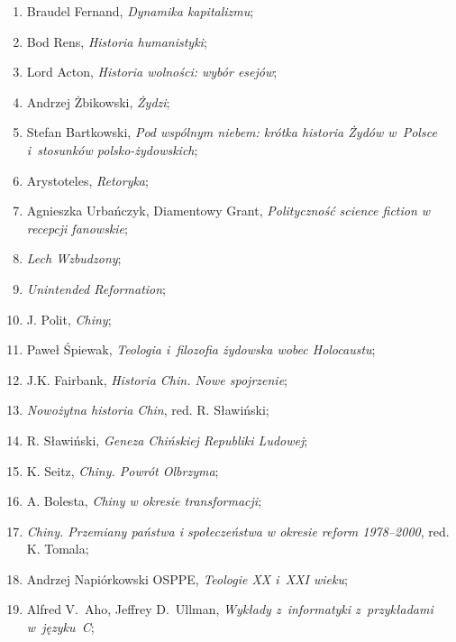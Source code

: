 \documentclass[a4paper,11pt]{article}
\begin{document}
\begin{enumerate}
\item Braudel Fernand, \textit{Dynamika kapitalizmu};

\item Bod Rens, \textit{Historia humanistyki};


\item Lord Acton, \textit{Historia wolności: wybór esejów};

\item Andrzej Żbikowski, \textit{Żydzi};

\item Stefan Bartkowski, \textit{Pod wspólnym niebem: krótka historia
    Żydów w~Polsce i~stosunków polsko-żydowskich};

\item Arystoteles, \textit{Retoryka};

\item Agnieszka Urbańczyk, Diamentowy Grant, \textit{Polityczność
    science fiction w recepcji fanowskie};

\item \textit{Lech Wzbudzony};

\item \textit{Unintended Reformation};

\item J. Polit, \textit{Chiny};

\item Paweł Śpiewak, \textit{Teologia i~filozofia żydowska wobec
    Holocaustu};

\item J.K. Fairbank, \textit{Historia Chin. Nowe spojrzenie};

\item \textit{Nowożytna historia Chin}, red. R. Sławiński;

\item R. Sławiński, \textit{Geneza Chińskiej Republiki Ludowej};

\item K. Seitz, \textit{Chiny. Powrót Olbrzyma};

\item A. Bolesta, \textit{Chiny w okresie transformacji};

\item \textit{Chiny. Przemiany państwa i społeczeństwa w okresie reform
    1978--2000}, red. K. Tomala;

\item Andrzej Napiórkowski OSPPE, \textit{Teologie XX i~XXI wieku};

\item Alfred V.~Aho, Jeffrey D.~Ullman, \textit{Wykłady z~informatyki
    z~przykładami w~języku~C};


\end{enumerate}
\end{document}
